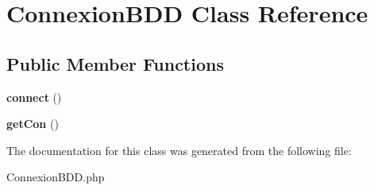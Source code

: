 \hypertarget{class_connexion_b_d_d}{}\section{Connexion\+B\+DD Class Reference}
\label{class_connexion_b_d_d}
\subsection*{Public Member Functions}
\begin{DoxyCompactItemize}
\item 
\mbox{\label{class_connexion_b_d_d_a78572828d11dcdf2a498497d9001d557}} 
{\bfseries connect} ()
\item 
\mbox{\label{class_connexion_b_d_d_a69d47b951343847eb872495590d43109}} 
{\bfseries get\+Con} ()
\end{DoxyCompactItemize}


The documentation for this class was generated from the following file\+:\begin{DoxyCompactItemize}
\item 
Connexion\+B\+D\+D.\+php\end{DoxyCompactItemize}
